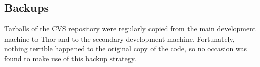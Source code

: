 
\subsection{Backups}

Tarballs of the CVS repository were regularly copied from the main development machine to Thor and to the secondary development machine. Fortunately, nothing terrible happened to the original copy of the code, so no occasion was found to make use of this backup strategy.

